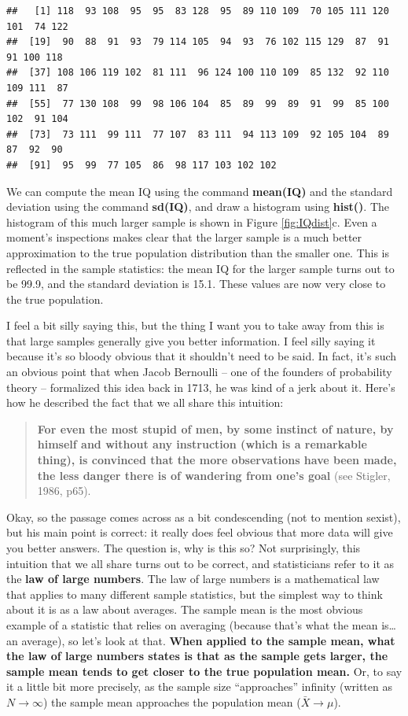 \documentclass[]{book}
\begin{document}
\begin{verbatim}
##   [1] 118  93 108  95  95  83 128  95  89 110 109  70 105 111 120 101  74 122
##  [19]  90  88  91  93  79 114 105  94  93  76 102 115 129  87  91  91 100 118
##  [37] 108 106 119 102  81 111  96 124 100 110 109  85 132  92 110 109 111  87
##  [55]  77 130 108  99  98 106 104  85  89  99  89  91  99  85 100 102  91 104
##  [73]  73 111  99 111  77 107  83 111  94 113 109  92 105 104  89  87  92  90
##  [91]  95  99  77 105  86  98 117 103 102 102
\end{verbatim}

We can compute the mean IQ using the command \textbf{mean(IQ)} and the standard deviation using the command \textbf{sd(IQ)}, and draw a histogram using \textbf{hist()}. The histogram of this much larger sample is shown in Figure \ref{fig:IQdist}c. Even a moment's inspections makes clear that the larger sample is a much better approximation to the true population distribution than the smaller one. This is reflected in the sample statistics: the mean IQ for the larger sample turns out to be 99.9, and the standard deviation is 15.1. These values are now very close to the true population.

I feel a bit silly saying this, but the thing I want you to take away from this is that large samples generally give you better information. I feel silly saying it because it's so bloody obvious that it shouldn't need to be said. In fact, it's such an obvious point that when Jacob Bernoulli -- one of the founders of probability theory -- formalized this idea back in 1713, he was kind of a jerk about it. Here's how he described the fact that we all share this intuition:

\begin{quote}
\textbf{For even the most stupid of men, by some instinct of nature, by himself and without any instruction (which is a remarkable thing), is convinced that the more observations have been made, the less danger there is of wandering from one's goal} (see Stigler, 1986, p65).
\end{quote}

Okay, so the passage comes across as a bit condescending (not to mention sexist), but his main point is correct: it really does feel obvious that more data will give you better answers. The question is, why is this so? Not surprisingly, this intuition that we all share turns out to be correct, and statisticians refer to it as the \textbf{law of large numbers}. The law of large numbers is a mathematical law that applies to many different sample statistics, but the simplest way to think about it is as a law about averages. The sample mean is the most obvious example of a statistic that relies on averaging (because that's what the mean is\ldots{} an average), so let's look at that. \textbf{When applied to the sample mean, what the law of large numbers states is that as the sample gets larger, the sample mean tends to get closer to the true population mean.} Or, to say it a little bit more precisely, as the sample size ``approaches'' infinity (written as \(N \rightarrow \infty\)) the sample mean approaches the population mean (\(\bar{X} \rightarrow \mu\)).
\end{document}
